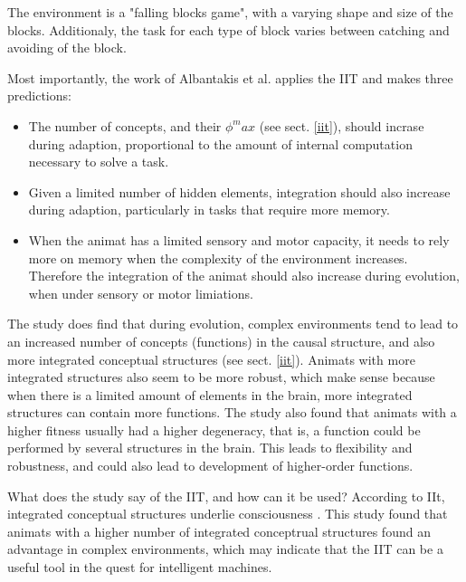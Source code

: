 The environment is a "falling blocks game", with a varying shape and size of the blocks. Additionaly, the task for each type of block varies between catching and avoiding of the block.

Most importantly, the work of Albantakis et al. applies the IIT and makes three predictions:
\begin{itemize}
\item{}
The number of concepts, and their $\phi^max$ (see sect. \vref{iit}), should incrase during adaption, proportional to the amount of internal computation necessary to solve a task.
\item{}
Given a limited number of hidden elements, integration should also increase during adaption, particularly in tasks that require more memory.
\item{}
When the animat has a limited sensory and motor capacity, it needs to rely more on memory when the complexity of the environment increases. Therefore the integration of the animat should also increase during evolution, when under sensory or motor limiations.\cite{albantakis_evolution_2014}
\end{itemize}

The study does find that during evolution, complex environments tend to lead to an increased number of concepts (functions) in the causal structure, and also more integrated conceptual structures (see sect. \vref{iit}).
Animats with more integrated structures also seem to be more robust, which make sense because when there is a limited amount of elements in the brain, more integrated structures can contain more functions.
The study also found that animats with a higher fitness usually had a higher degeneracy, that is, a function could be performed by several structures in the brain.
This leads to flexibility and robustness, and could also lead to development of higher-order functions.\cite{albantakis_evolution_2014}

What does the study say of the IIT, and how can it be used? According to IIt, integrated conceptual structures underlie consciousness \cite{tononi_integrated_2016}. This study found that animats with a higher number of integrated conceptrual structures found an advantage in complex environments, which may indicate that the IIT can be a useful tool in the quest for intelligent machines.





